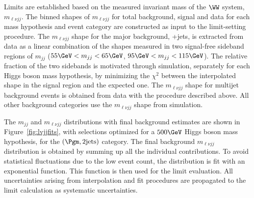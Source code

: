Limits are established based on the measured invariant mass of the $\WW$ system, $m_{\ell\nu jj}$. The
binned shapes of
$m_{\ell\nu jj}$ for total background, signal and data for each mass hypothesis and event category are
constructed as
input to the limit-setting procedure. The $m_{\ell\nu jj}$ shape for the major background, \PW+jets,
is extracted from data as a linear combination of the shapes measured in two signal-free sideband
regions of $m_{jj}$ ($55\GeV <m_{jj} < 65\GeV$,
$95\GeV < m_{jj} < 115\GeV$). The relative fraction of the two sidebands is motivated through
simulation, separately for
each Higgs boson mass hypothesis, by minimizing the $\chi^2$ between the interpolated shape in the
signal region and the expected one. The $m_{\ell\nu jj}$ shape for multijet background events is
obtained from data with the procedure described above.
All other background categories use the $m_{\ell\nu{}jj}$ shape
from simulation.

The $m_{jj}$ and $m_{\ell\nu jj}$ distributions with final background estimates are 
shown in Figure~\ref{fig:lvjjfits}, with
selections optimized
for a $500\GeV$ Higgs boson mass hypothesis, for the $(\Pgm,2\rm{jets})$ category. 
The final background $m_{\ell\nu{}jj}$ distribution is obtained by summing
up all the individual contributions.
To avoid statistical fluctuations due to the low event count,
the distribution is fit with an exponential function. This function
is then used for the
limit evaluation. All uncertainties arising from interpolation and fit procedures are propagated to
the limit calculation as
systematic uncertainties.




